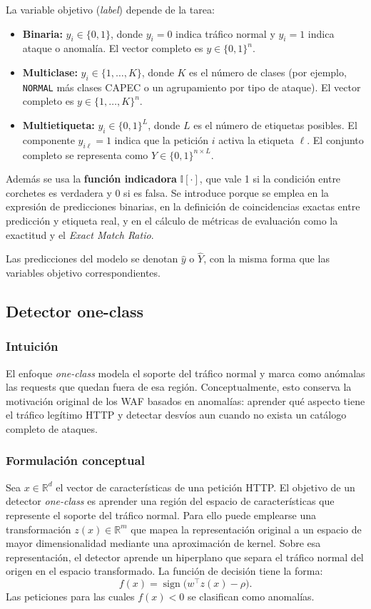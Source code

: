 \documentclass[12pt,oneside]{report}
\newcommand{\ind}{\mathbb{I}} %
\begin{document}
La variable objetivo (\textit{label}) depende de la tarea:

\begin{itemize}[leftmargin=*]
  \item \textbf{Binaria:} $y_i \in \{0,1\}$, donde $y_i=0$ indica tráfico normal y $y_i=1$ indica ataque o anomalía.
        El vector completo es $y \in \{0,1\}^n$.
  \item \textbf{Multiclase:} $y_i \in \{1,\dots,K\}$, donde $K$ es el número de clases (por ejemplo, \texttt{NORMAL} más clases CAPEC o un agrupamiento por tipo de ataque).
        El vector completo es $y \in \{1,\dots,K\}^n$.
  \item \textbf{Multietiqueta:} $y_i \in \{0,1\}^L$, donde $L$ es el número de etiquetas posibles.
        El componente $y_{i\ell}=1$ indica que la petición $i$ activa la etiqueta $\ell$.
        El conjunto completo se representa como $Y \in \{0,1\}^{n \times L}$.
\end{itemize}

Además se usa la \textbf{función indicadora} $\ind[\cdot]$, que vale 1 si la condición entre corchetes es verdadera y 0 si es falsa. Se introduce porque se emplea en la expresión de predicciones binarias, en la definición de coincidencias exactas entre predicción y etiqueta real, y en el cálculo de métricas de evaluación como la exactitud y el \textit{Exact Match Ratio}.

Las predicciones del modelo se denotan $\hat{y}$ o $\hat{Y}$, con la misma forma que las variables objetivo correspondientes.

\subsection{Detector one-class}
\subsubsection{Intuición}
El enfoque \textit{one-class} modela el soporte del tráfico normal y marca como anómalas las requests que quedan fuera de esa región. Conceptualmente, esto conserva la motivación original de los WAF basados en anomalías: aprender qué aspecto tiene el tráfico legítimo HTTP y detectar desvíos aun cuando no exista un catálogo completo de ataques.

\subsubsection{Formulación conceptual}
Sea $x \in \mathbb{R}^d$ el vector de características de una petición HTTP. El objetivo de un detector \textit{one-class} es aprender una región del espacio de características que represente el soporte del tráfico normal. Para ello puede emplearse una transformación $z(x) \in \mathbb{R}^m$ que mapea la representación original a un espacio de mayor dimensionalidad mediante una aproximación de kernel. Sobre esa representación, el detector aprende un hiperplano que separa el tráfico normal del origen en el espacio transformado. La función de decisión tiene la forma:
\[
f(x)=\operatorname{sign}\big(w^\top z(x)-\rho\big).
\]
Las peticiones para las cuales $f(x) < 0$ se clasifican como anomalías.
\end{document}
